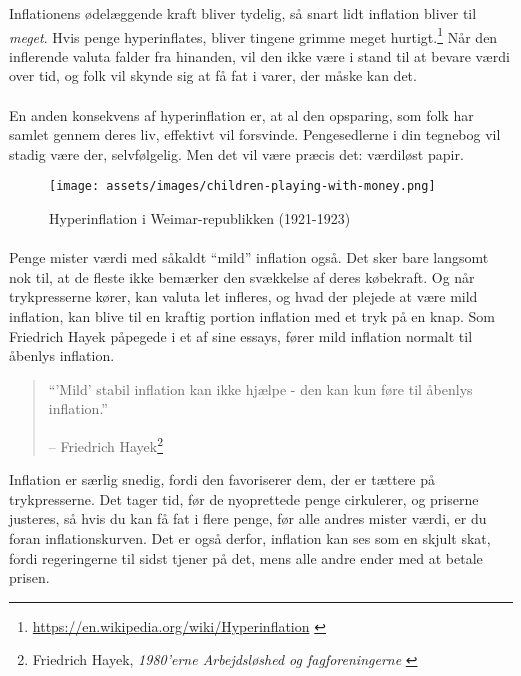 Inflationens ødelæggende kraft bliver tydelig, så snart lidt inflation bliver 
til \textit{meget}. Hvis penge hyperinflates, bliver tingene grimme meget 
hurtigt.\footnote{\url{https://en.wikipedia.org/wiki/Hyperinflation}
\cite{wiki:hyperinflation}} Når den inflerende valuta falder fra hinanden, 
vil den ikke være i stand til at bevare værdi over tid, og folk vil skynde 
sig at få fat i varer, der måske kan det.

\paragraph{}
En anden konsekvens af hyperinflation er, at al den opsparing, som folk har 
samlet gennem deres liv, effektivt vil forsvinde. Pengesedlerne i din tegnebog 
vil stadig være der, selvfølgelig. Men det vil være præcis det: værdiløst papir.

\begin{figure}[h!]
    \centering
    \texttt{[image: assets/images/children-playing-with-money.png]}
    \caption{Hyperinflation i Weimar-republikken (1921-1923)}
    \label{fig:children-playing-with-money}
\end{figure}

\paragraph{}
Penge mister værdi med såkaldt \enquote{mild} inflation også. Det sker bare 
langsomt nok til, at de fleste ikke bemærker den svækkelse af deres købekraft.
Og når trykpresserne kører, kan valuta let infleres, og hvad der plejede at 
være mild inflation, kan blive til en kraftig portion inflation med et tryk på 
en knap. Som Friedrich Hayek påpegede i et af sine essays, fører mild inflation 
normalt til åbenlys inflation.

\begin{quotation}\begin{samepage}
\enquote{'Mild' stabil inflation kan ikke hjælpe - den kan kun føre til åbenlys
inflation.} \begin{flushright} -- Friedrich Hayek\footnote{Friedrich Hayek, 
    \textit{1980'erne Arbejdsløshed og fagforeningerne} \cite{hayek-inflation}}
\end{flushright}\end{samepage}\end{quotation}

Inflation er særlig snedig, fordi den favoriserer dem, der er tættere på 
trykpresserne. Det tager tid, før de nyoprettede penge cirkulerer, og priserne 
justeres, så hvis du kan få fat i flere penge, før alle andres mister værdi, 
er du foran inflationskurven. Det er også derfor, inflation kan ses som en 
skjult skat, fordi regeringerne til sidst tjener på det, mens alle andre ender 
med at betale prisen.

